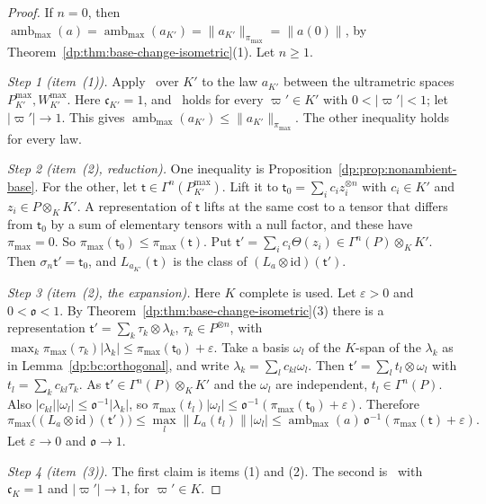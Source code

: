 \documentclass[11pt]{amsart}
\theoremstyle{definition}
\theoremstyle{remark}
\numberwithin{equation}{section}
\newcommand{\id}{\mathrm{id}}
\newcommand{\abs}[1]{\lvert #1\rvert}
\newcommand{\norm}[1]{\lVert #1\rVert}
\theoremstyle{plain}
\theoremstyle{definition}
\theoremstyle{plain}
\begin{document}
\begin{proof}
If $n=0$, then $\operatorname{amb}_{\max}(a)=\operatorname{amb}_{\max}(a_{K'})=\norm{a_{K'}}_{\pi_{\max}}=\norm{a(0)}$, by Theorem~\ref{dp:thm:base-change-isometric}(1). Let $n\ge1$.

\emph{Step 1 (item~(1)).} Apply~\cite[(14.9)]{I} over $K'$ to the law $a_{K'}$ between the ultrametric spaces $P^{\max}_{K'},W^{\max}_{K'}$. Here $\mathfrak c_{K'}=1$, and~\cite[(14.9)]{I} holds for every $\varpi'\in K'$ with $0<\abs{\varpi'}<1$; let $\abs{\varpi'}\to1$. This gives $\operatorname{amb}_{\max}(a_{K'})\le\norm{a_{K'}}_{\pi_{\max}}$. The other inequality holds for every law.

\emph{Step 2 (item~(2), reduction).} One inequality is Proposition~\ref{dp:prop:nonambient-base}. For the other, let $\mathsf t\in\Gamma^n(P^{\max}_{K'})$. Lift it to $\mathsf t_0=\sum_ic_iz_i^{\otimes n}$ with $c_i\in K'$ and $z_i\in P\otimes_KK'$. A representation of $\mathsf t$ lifts at the same cost to a tensor that differs from $\mathsf t_0$ by a sum of elementary tensors with a null factor, and these have $\pi_{\max}=0$. So $\pi_{\max}(\mathsf t_0)\le\pi_{\max}(\mathsf t)$. Put $\mathsf t'=\sum_ic_i\Theta(z_i)\in\Gamma^n(P)\otimes_KK'$. Then $\sigma_n\mathsf t'=\mathsf t_0$, and $L_{a_{K'}}(\mathsf t)$ is the class of $(L_a\otimes\id)(\mathsf t')$.

\emph{Step 3 (item~(2), the expansion).} Here $K$ complete is used. Let $\varepsilon>0$ and $0<\mathfrak o<1$. By Theorem~\ref{dp:thm:base-change-isometric}(3) there is a representation $\mathsf t'=\sum_k\tau_k\otimes\lambda_k$, $\tau_k\in P^{\otimes n}$, with $\max_k\pi_{\max}(\tau_k)\abs{\lambda_k}\le\pi_{\max}(\mathsf t_0)+\varepsilon$. Take a basis $\omega_l$ of the $K$-span of the $\lambda_k$ as in Lemma~\ref{dp:bc:orthogonal}, and write $\lambda_k=\sum_lc_{kl}\omega_l$. Then $\mathsf t'=\sum_lt_l\otimes\omega_l$ with $t_l=\sum_kc_{kl}\tau_k$. As $\mathsf t'\in\Gamma^n(P)\otimes_KK'$ and the $\omega_l$ are independent, $t_l\in\Gamma^n(P)$. Also $\abs{c_{kl}}\abs{\omega_l}\le\mathfrak o^{-1}\abs{\lambda_k}$, so $\pi_{\max}(t_l)\abs{\omega_l}\le\mathfrak o^{-1}(\pi_{\max}(\mathsf t_0)+\varepsilon)$. Therefore
\[
 \pi_{\max}\bigl((L_a\otimes\id)(\mathsf t')\bigr)\le\max_l\norm{L_a(t_l)}\abs{\omega_l}\le\operatorname{amb}_{\max}(a)\,\mathfrak o^{-1}(\pi_{\max}(\mathsf t)+\varepsilon).
\]
Let $\varepsilon\to0$ and $\mathfrak o\to1$.

\emph{Step 4 (item~(3)).} The first claim is items (1) and (2). The second is~\cite[(14.9)]{I} with $\mathfrak c_K=1$ and $\abs{\varpi'}\to1$, for $\varpi'\in K$.
\end{proof}
\end{document}
